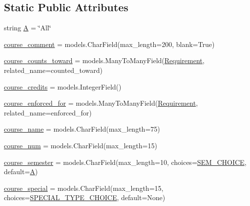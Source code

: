 \subsection*{Static Public Attributes}
\begin{DoxyCompactItemize}
\item 
string \mbox{\hyperlink{classmavAgenda_1_1landing_1_1models_1_1Course_ac88ad8d55bb2f4ce8395b5691a545cf7}{A}} = \char`\"{}All\char`\"{}
\item 
\mbox{\hyperlink{classmavAgenda_1_1landing_1_1models_1_1Course_a86e9d0e163b35f3cf2815ec9967a1a69}{course\+\_\+comment}} = models.\+Char\+Field(max\+\_\+length=200, blank=True)
\item 
\mbox{\hyperlink{classmavAgenda_1_1landing_1_1models_1_1Course_a16e98691d0bd9076788112493182023e}{course\+\_\+counts\+\_\+toward}} = models.\+Many\+To\+Many\+Field(\mbox{\hyperlink{classmavAgenda_1_1landing_1_1models_1_1Requirement}{Requirement}}, related\+\_\+name=\textquotesingle{}counted\+\_\+toward\textquotesingle{})
\item 
\mbox{\hyperlink{classmavAgenda_1_1landing_1_1models_1_1Course_a9292fd2a8b1f5acd72a96b5e0ff2cda0}{course\+\_\+credits}} = models.\+Integer\+Field()
\item 
\mbox{\hyperlink{classmavAgenda_1_1landing_1_1models_1_1Course_ab4dbdb33b64f85c6dd36539868a4d3ad}{course\+\_\+enforced\+\_\+for}} = models.\+Many\+To\+Many\+Field(\mbox{\hyperlink{classmavAgenda_1_1landing_1_1models_1_1Requirement}{Requirement}}, related\+\_\+name=\textquotesingle{}enforced\+\_\+for\textquotesingle{})
\item 
\mbox{\hyperlink{classmavAgenda_1_1landing_1_1models_1_1Course_a9707b11f71fb228fb73e4b704157f2be}{course\+\_\+name}} = models.\+Char\+Field(max\+\_\+length=75)
\item 
\mbox{\hyperlink{classmavAgenda_1_1landing_1_1models_1_1Course_ab7b44a82da024d5102f98f541a80985c}{course\+\_\+num}} = models.\+Char\+Field(max\+\_\+length=15)
\item 
\mbox{\hyperlink{classmavAgenda_1_1landing_1_1models_1_1Course_a55da9d20d80ec2c6616547fb1c674b78}{course\+\_\+semester}} = models.\+Char\+Field(max\+\_\+length=10, choices=\mbox{\hyperlink{classmavAgenda_1_1landing_1_1models_1_1Course_ae05d55465b858136d199cf3fb56c1cd9}{S\+E\+M\+\_\+\+C\+H\+O\+I\+CE}}, default=\mbox{\hyperlink{classmavAgenda_1_1landing_1_1models_1_1Course_ac88ad8d55bb2f4ce8395b5691a545cf7}{A}})
\item 
\mbox{\hyperlink{classmavAgenda_1_1landing_1_1models_1_1Course_a5f117674611634b01e100c61462d02a6}{course\+\_\+special}} = models.\+Char\+Field(max\+\_\+length=15, choices=\mbox{\hyperlink{classmavAgenda_1_1landing_1_1models_1_1Course_a810babb1a1eb7ec206989017427fd2af}{S\+P\+E\+C\+I\+A\+L\+\_\+\+T\+Y\+P\+E\+\_\+\+C\+H\+O\+I\+CE}}, default=None)

\end{DoxyCompactItemize}
